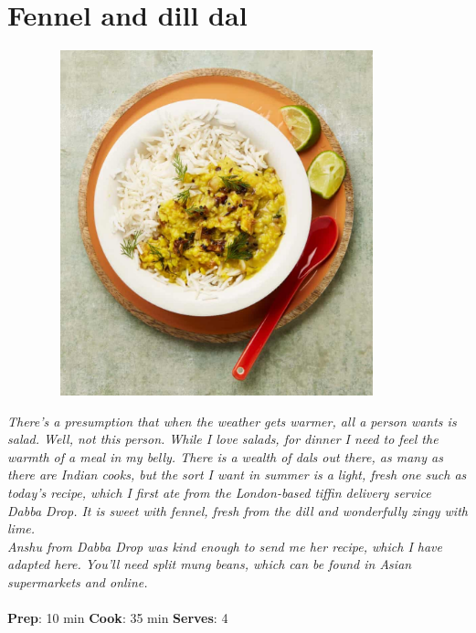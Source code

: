 \documentclass{book}
\begin{document}
\section{Fennel and dill dal}
\begin{figure}
\centering\includegraphics[width=10cm,height=10cm,keepaspectratio]{Recipe_Pictures/Fennel_and_dill_dal.png}
\end{figure}
\emph{There’s a presumption that when the weather gets warmer, all a person wants is salad. Well, not this person. While I love salads, for dinner I need to feel the warmth of a meal in my belly. There is a wealth of dals out there, as many as there are Indian cooks, but the sort I want in summer is a light, fresh one such as today’s recipe, which I first ate from the London-based tiffin delivery service Dabba Drop. It is sweet with fennel, fresh from the dill and wonderfully zingy with lime.\\ 
Anshu from Dabba Drop was kind enough to send me her recipe, which I have adapted here. You’ll need split mung beans, which can be found in Asian supermarkets and online.}\\\\ 
\textbf{Prep}: 10 min
\textbf{Cook}: 35 min
\textbf{Serves}: 4
\end{document}
